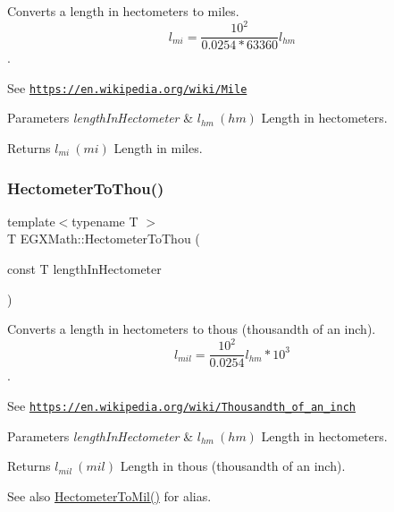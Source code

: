 Converts a length in hectometers to miles. \[ l_{mi}=\frac{10^{2}}{0.0254 * 63360} l_{hm} \]. 

See \href{https://en.wikipedia.org/wiki/Mile}{\tt https\+://en.\+wikipedia.\+org/wiki/\+Mile} 
\begin{DoxyParams}{Parameters}
{\em length\+In\+Hectometer} & $ l_{hm}\ (hm)$ Length in hectometers. \\
\hline
\end{DoxyParams}
\begin{DoxyReturn}{Returns}
$ l_{mi}\ (mi)$ Length in miles. 
\end{DoxyReturn}
\mbox{\label{group___e_g_x_math-_conversions-_length_conversions-_s_i-_hectometer-_imperial_gabfd81bd5bb9e8293005c23794f541a1c}} 
\subsubsection{\texorpdfstring{Hectometer\+To\+Thou()}{HectometerToThou()}}
{\footnotesize\ttfamily template$<$typename T $>$ \\
T E\+G\+X\+Math\+::\+Hectometer\+To\+Thou (\begin{DoxyParamCaption}\item[{const T}]{length\+In\+Hectometer }\end{DoxyParamCaption})}



Converts a length in hectometers to thous (thousandth of an inch). \[ l_{mil}= \frac{10^{2}}{0.0254} l_{hm} * 10^{3} \]. 

See \href{https://en.wikipedia.org/wiki/Thousandth_of_an_inch}{\tt https\+://en.\+wikipedia.\+org/wiki/\+Thousandth\+\_\+of\+\_\+an\+\_\+inch} 
\begin{DoxyParams}{Parameters}
{\em length\+In\+Hectometer} & $ l_{hm}\ (hm)$ Length in hectometers. \\
\hline
\end{DoxyParams}
\begin{DoxyReturn}{Returns}
$ l_{mil}\ (mil)$ Length in thous (thousandth of an inch). 
\end{DoxyReturn}
\begin{DoxySeeAlso}{See also}
\mbox{\hyperlink{group___e_g_x_math-_conversions-_length_conversions-_s_i-_hectometer-_imperial_ga117bf04e7f132a33598fa098a8b7c17e}{Hectometer\+To\+Mil()}} for alias. 
\end{DoxySeeAlso}
\mbox{\label{group___e_g_x_math-_conversions-_length_conversions-_s_i-_hectometer-_imperial_ga84866f087daa74cdd00348f42462d13c}} 

